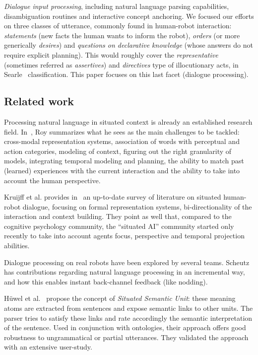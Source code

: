 \begin{inparaenum}[\itshape 1)]
\item \emph{Dialogue input processing}, including natural language parsing
capabilities, disambiguation routines and interactive concept anchoring. We
focused our efforts on three classes of utterance, commonly found in
human-robot interaction: \emph{statements} (\ie new facts the human wants to
inform the robot), \emph{orders} (or more generically \emph{desires}) and
\emph{questions on declarative knowledge} (whose answers do not require
explicit planning). This would roughly cover the \emph{representative}
(sometimes referred as \emph{assertives}) and \emph{directives} type of
illocutionary acts, in Searle~\cite{Searle1976} classification. This paper
focuses on this last facet (dialogue processing).

\end{inparaenum}

\subsection{Related work}

Processing natural language in situated context is already an established
research field. In~\cite{Roy2005}, Roy summarizes what he sees as the main
challenges to be tackled: cross-modal representation systems, association of
words with perceptual and action categories, modeling of context, figuring out
the right granularity of models, integrating temporal modeling and planning,
the ability to match past (learned) experiences with the current interaction
and the ability to take into account the human perspective.

Kruijff et al. provides in~\cite{Kruijff2010} an up-to-date survey of literature
on situated human-robot dialogue, focusing on formal representation systems,
bi-directionality of the interaction and context building. They point as well
that, compared to the cognitive psychology community, the ``situated AI''
community started only recently to take into account agents focus, perspective and temporal
projection abilities.

Dialogue processing on real robots have been explored by several teams.
Scheutz~\cite{Brick2007} has contributions regarding natural language
processing in an incremental way, and how this enables instant back-channel
feedback (like nodding).

Hüwel et al.~\cite{Huwel2006} propose the concept of \textit{Situated Semantic
Unit}: these meaning atoms are extracted from sentences and expose semantic
links to other units. The parser tries to satisfy these links and rate
accordingly the semantic interpretation of the sentence. Used in conjunction
with ontologies, their approach offers good robustness to ungrammatical or
partial utterances. They validated the approach with an extensive user-study.

